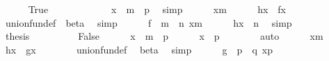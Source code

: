 \begin{isabellebody}
\ \ \ \ \isamarkupfalse%
\ True\isanewline
\ \ \ \ \isamarkupfalse%
\ \isamarkupfalse%
\isanewline
\ \ \ \ \ \ {\isachardoublequoteopen}x\ {\isasymin}\ m\ {\isasymunion}\ p{\isachardoublequoteclose}\ \isamarkupfalse%
\ simp\isanewline
\ \ \ \ \isamarkupfalse%
\ {\isacartoucheopen}x{\isasymin}m{\isacartoucheclose}\isanewline
\ \ \ \ \isamarkupfalse%
\ {\isachardoublequoteopen}{\isacharquery}{\kern0pt}h{\isacharbackquote}{\kern0pt}x\ {\isacharequal}{\kern0pt}\ f{\isacharbackquote}{\kern0pt}x{\isachardoublequoteclose}\isanewline
\ \ \ \ \ \ \isamarkupfalse%
\ union{\isacharunderscore}{\kern0pt}fun{\isacharunderscore}{\kern0pt}def\ \ beta\ \isamarkupfalse%
\ simp\isanewline
\ \ \ \ \isamarkupfalse%
\ {\isacartoucheopen}f\ {\isasymin}\ m\ {\isasymrightarrow}\ n{\isacartoucheclose}\ {\isacartoucheopen}x{\isasymin}m{\isacartoucheclose}\isanewline
\ \ \ \ \isamarkupfalse%
\ {\isachardoublequoteopen}{\isacharquery}{\kern0pt}h{\isacharbackquote}{\kern0pt}x\ {\isasymin}\ n{\isachardoublequoteclose}\ \isamarkupfalse%
\ simp\isanewline
\ \ \ \ \isamarkupfalse%
\ \isamarkupfalse%
\ {\isacharquery}{\kern0pt}thesis\ \isacommand{{\isachardot}{\kern0pt}{\isachardot}{\kern0pt}}\isamarkupfalse%
\isanewline
\ \ \isamarkupfalse%
\isanewline
\ \ \ \ \isamarkupfalse%
\ False\isanewline
\ \ \ \ \isamarkupfalse%
\ {\isacartoucheopen}x\ {\isasymin}\ m\ {\isasymunion}\ p{\isacartoucheclose}\isanewline
\ \ \ \ \isamarkupfalse%
\ {\isachardoublequoteopen}x\ {\isasymin}\ p{\isachardoublequoteclose}\isanewline
\ \ \ \ \ \ \isamarkupfalse%
\ auto\isanewline
\ \ \ \ \isamarkupfalse%
\ {\isacartoucheopen}x{\isasymnotin}m{\isacartoucheclose}\isanewline
\ \ \ \ \isamarkupfalse%
\ {\isachardoublequoteopen}{\isacharquery}{\kern0pt}h{\isacharbackquote}{\kern0pt}x\ {\isacharequal}{\kern0pt}\ g{\isacharbackquote}{\kern0pt}x{\isachardoublequoteclose}\isanewline
\ \ \ \ \ \ \isamarkupfalse%
\ union{\isacharunderscore}{\kern0pt}fun{\isacharunderscore}{\kern0pt}def\ \isamarkupfalse%
\ beta\ \isamarkupfalse%
\ simp\isanewline
\ \ \ \ \isamarkupfalse%
\ {\isacartoucheopen}g\ {\isasymin}\ p\ {\isasymrightarrow}\ q{\isacartoucheclose}\ {\isacartoucheopen}x{\isasymin}p{\isacartoucheclose}\isanewline
\ \ \ \ \isamarkupfalse%

\end{isabellebody}
